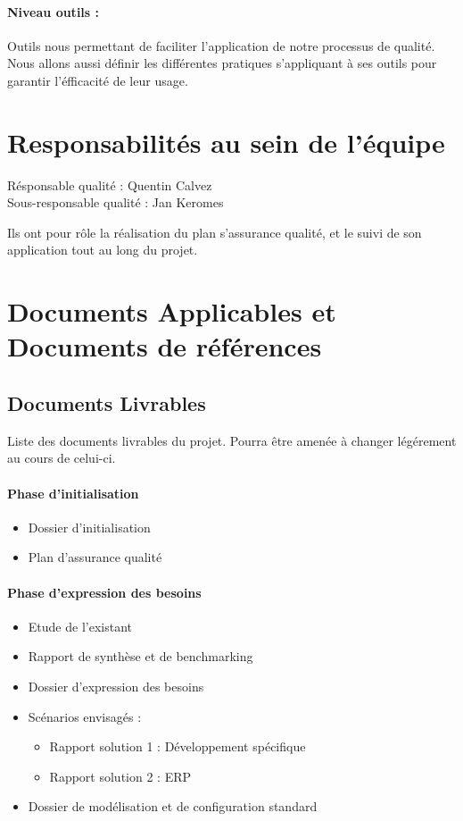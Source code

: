 \documentclass[a4paper, 18pt]{article}
\begin{document}
\paragraph{Niveau outils :} Outils nous permettant de faciliter l'application de notre processus de qualité. Nous allons aussi définir les différentes pratiques s'appliquant à ses outils pour garantir l'éfficacité de leur usage.

\section{Responsabilités au sein de l'équipe}

Résponsable qualité : Quentin Calvez \\
Sous-responsable qualité : Jan Keromes

Ils ont pour rôle la réalisation du plan s'assurance qualité, et le suivi de son application tout au long du projet.

\section{Documents Applicables et Documents de références}

\subsection{Documents Livrables}

Liste des documents livrables du projet. Pourra être amenée à changer légérement au cours de celui-ci.

\paragraph*{Phase d'initialisation}

\begin{itemize}
\item Dossier d’initialisation
\item Plan d’assurance qualité
\end{itemize}


\paragraph*{Phase d'expression des besoins}
\begin{itemize}

\item Etude de l'existant
\item Rapport de synthèse et de benchmarking
\item Dossier d’expression des besoins
\item Scénarios envisagés :

\begin{itemize}
\item Rapport solution 1 : Développement spécifique
\item Rapport solution 2 : ERP 
\end{itemize}

\item Dossier de modélisation et de configuration standard

\end{itemize}
\end{document}
